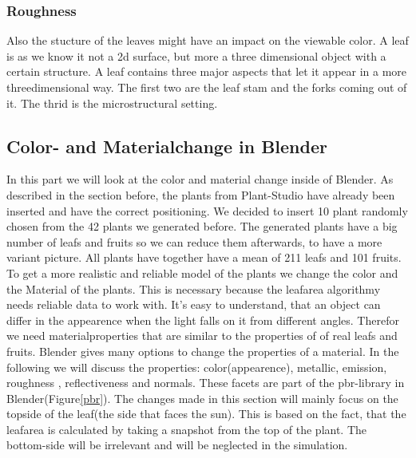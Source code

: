 \subsubsection{Roughness}
Also the stucture of the leaves might have an impact on the viewable color. A leaf is as we know it not a 2d surface, but more a three dimensional object with a certain structure. A leaf contains three major aspects that let it appear in a more threedimensional way. The first two are the leaf stam and the forks coming out of it. The thrid is the microstructural setting.

\subsection{Color- and Materialchange in Blender}


In this part we will look at the color and material change inside of Blender. As described in the section before, the plants from Plant-Studio have already been inserted and have the correct positioning. We decided to insert 10 plant randomly chosen from the 42 plants we generated before. The generated plants have a big number of leafs and fruits so we can reduce them afterwards, to have a more variant picture. \newline
All plants have together have a mean of 211 leafs and 101 fruits.
To get a more realistic and reliable model of the plants we change the color and the Material of the plants. This is necessary because the leafarea algorithmy needs reliable data to work with. It's easy to understand, that an object can differ in the appearence when the light falls on it from different angles. Therefor we need materialproperties that are similar to the properties of of real leafs and fruits.
Blender gives many options to change the properties of a material. In the following we will discuss the properties: color(appearence), metallic, emission, roughness , reflectiveness and normals. These facets are part of the pbr-library in Blender(Figure\ref{pbr}).
The changes made in this section will mainly focus on the topside of the leaf(the side that faces the sun). This is based on the fact, that the leafarea is calculated by taking a snapshot from the top of the plant. The bottom-side will be irrelevant and will be neglected in the simulation.

